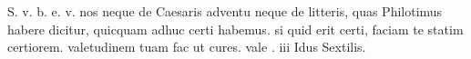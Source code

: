 


S. v. b. e. v. nos neque de Caesaris adventu neque de litteris, quas Philotimus habere dicitur, quicquam adhuc certi habemus. si quid erit certi, faciam te statim certiorem. valetudinem tuam fac ut cures. vale . iii Idus Sextilis.

